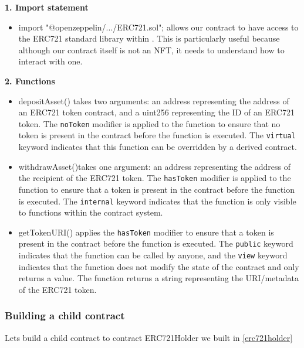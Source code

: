 \documentclass{article}
\theoremstyle{theorem}
\theoremstyle{definition}
\theoremstyle{remark}
\begin{document}
\medskip\noindent
\textbf{1. Import statement}
\begin{itemize}
    \item \colorbox{Gainsboro!60!Lavender}{import "@openzeppelin/.../ERC721.sol";} allows our contract to have access to the ERC721 standard library within \cite{OZ}. This is particularly useful because although our contract itself is not an NFT, it needs to understand how to interact with one.
\end{itemize}
\textbf{2. Functions}
\begin{itemize}
    \item \colorbox{Gainsboro!60!Lavender}{depositAsset()} takes two arguments: an address representing the address of an ERC721 token contract, and a uint256 representing the ID of an ERC721 token. The \texttt{noToken} modifier is applied to the function to ensure that no token is present in the contract before the function is executed. The \texttt{virtual} keyword indicates that this function can be overridden by a derived contract.
    \item \colorbox{Gainsboro!60!Lavender}{withdrawAsset()}takes one argument: an address representing the address of the recipient of the ERC721 token. The \texttt{hasToken} modifier is applied to the function to ensure that a token is present in the contract before the function is executed. The \texttt{internal} keyword indicates that the function is only visible to functions within the contract system.
    \item \colorbox{Gainsboro!60!Lavender}{getTokenURI()} applies the \texttt{hasToken} modifier to ensure that a token is present in the contract before the function is executed. The \texttt{public} keyword indicates that the function can be called by anyone, and the \texttt{view} keyword indicates that the function does not modify the state of the contract and only returns a value. The function returns a string representing the URI/metadata of the ERC721 token.
\end{itemize}

\subsubsection{Building a child contract} \label{buildingchild}
Lets build a child contract to  \colorbox{Gainsboro!60!Lavender}{contract ERC721Holder} we built in \ref{erc721holder}
\end{document}
